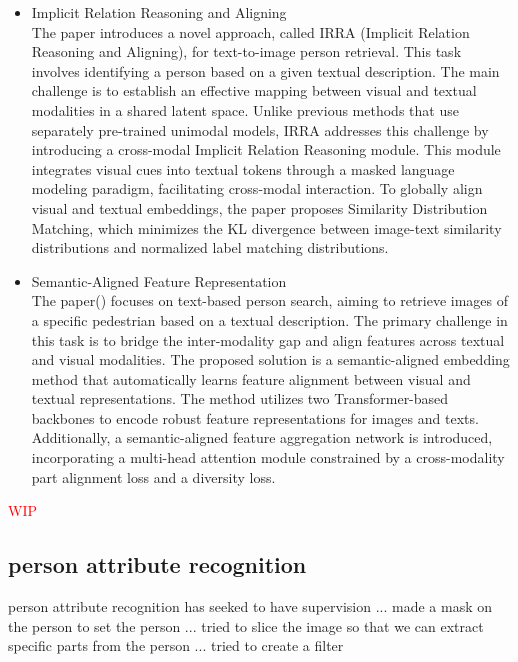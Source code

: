 \begin{itemize}
    \item Implicit Relation Reasoning and Aligning\\
    The paper introduces a novel approach, called IRRA (Implicit Relation Reasoning and Aligning), for text-to-image person retrieval. This task involves identifying a person based on a given textual description. The main challenge is to establish an effective mapping between visual and textual modalities in a shared latent space. Unlike previous methods that use separately pre-trained unimodal models, IRRA addresses this challenge by introducing a cross-modal Implicit Relation Reasoning module. This module integrates visual cues into textual tokens through a masked language modeling paradigm, facilitating cross-modal interaction. To globally align visual and textual embeddings, the paper proposes Similarity Distribution Matching, which minimizes the KL divergence between image-text similarity distributions and normalized label matching distributions. 

    \item Semantic-Aligned Feature Representation\\
    The paper(\cite{li2021learning}) focuses on text-based person search, aiming to retrieve images of a specific pedestrian based on a textual description. The primary challenge in this task is to bridge the inter-modality gap and align features across textual and visual modalities. The proposed solution is a semantic-aligned embedding method that automatically learns feature alignment between visual and textual representations. The method utilizes two Transformer-based backbones to encode robust feature representations for images and texts. Additionally, a semantic-aligned feature aggregation network is introduced, incorporating a multi-head attention module constrained by a cross-modality part alignment loss and a diversity loss. 
\end{itemize}
\textcolor{red}{WIP}\\





\subsection{person attribute recognition}
person attribute recognition has seeked to have supervision 
... made a mask on the person to set the person 
... tried to slice the image so that we can extract specific parts from the person
... tried to create a filter 

